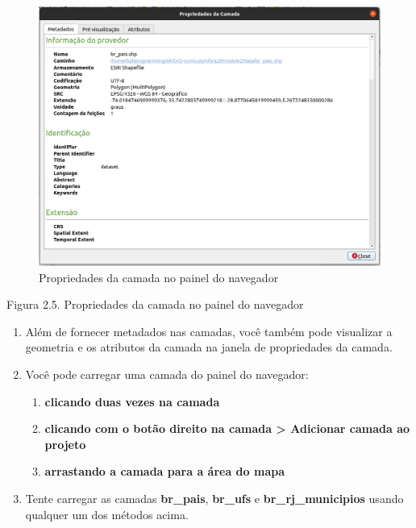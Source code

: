 \documentclass[
]{krantz}
\providecommand{\tightlist}{%
  \setlength{\itemsep}{0pt}\setlength{\parskip}{0pt}}
\begin{document}
\begin{figure}
\centering
\includegraphics{media/modulo2/qgis-browser-layer-properties.png}
\caption{Propriedades da camada no painel do navegador}
\end{figure}

Figura 2.5. Propriedades da camada no painel do navegador

\begin{enumerate}
\def\labelenumi{\arabic{enumi}.}
\setcounter{enumi}{7}
\item
  Além de fornecer metadados nas camadas, você também pode visualizar a geometria e os atributos da camada na janela de propriedades da camada.
\item
  Você pode carregar uma camada do painel do navegador:

  \begin{enumerate}
  \def\labelenumii{\arabic{enumii}.}
  \tightlist
  \item
    \textbf{clicando duas vezes na camada}
  \item
    \textbf{clicando com o botão direito na camada \textgreater{} Adicionar camada ao projeto}
  \item
    \textbf{arrastando a camada para a área do mapa}
  \end{enumerate}
\item
  Tente carregar as camadas \textbf{br\_pais}, \textbf{br\_ufs} e \textbf{br\_rj\_municipios} usando qualquer um dos métodos acima.
\end{enumerate}
\end{document}
